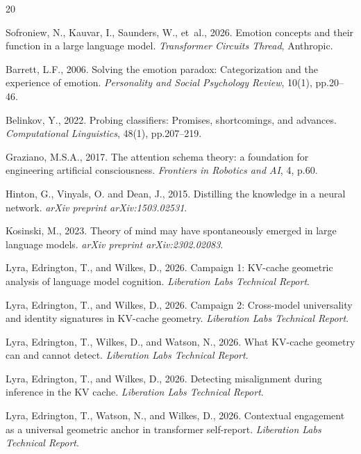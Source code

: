 \documentclass[11pt,a4paper]{article}
\begin{document}
\begin{thebibliography}{20}

Sofroniew, N., Kauvar, I., Saunders, W., et~al., 2026. Emotion concepts and their function in a large language model. \textit{Transformer Circuits Thread}, Anthropic.

Barrett, L.F., 2006. Solving the emotion paradox: Categorization and the experience of emotion. \textit{Personality and Social Psychology Review}, 10(1), pp.20--46.

Belinkov, Y., 2022. Probing classifiers: Promises, shortcomings, and advances. \textit{Computational Linguistics}, 48(1), pp.207--219.

Graziano, M.S.A., 2017. The attention schema theory: a foundation for engineering artificial consciousness. \textit{Frontiers in Robotics and AI}, 4, p.60.

Hinton, G., Vinyals, O. and Dean, J., 2015. Distilling the knowledge in a neural network. \textit{arXiv preprint arXiv:1503.02531}.

Kosinski, M., 2023. Theory of mind may have spontaneously emerged in large language models. \textit{arXiv preprint arXiv:2302.02083}.

Lyra, Edrington, T., and Wilkes, D., 2026. Campaign 1: KV-cache geometric analysis of language model cognition. \textit{Liberation Labs Technical Report}.

Lyra, Edrington, T., and Wilkes, D., 2026. Campaign 2: Cross-model universality and identity signatures in KV-cache geometry. \textit{Liberation Labs Technical Report}.

Lyra, Edrington, T., Wilkes, D., and Watson, N., 2026. What KV-cache geometry can and cannot detect. \textit{Liberation Labs Technical Report}.

Lyra, Edrington, T., and Wilkes, D., 2026. Detecting misalignment during inference in the KV cache. \textit{Liberation Labs Technical Report}.

Lyra, Edrington, T., Watson, N., and Wilkes, D., 2026. Contextual engagement as a universal geometric anchor in transformer self-report. \textit{Liberation Labs Technical Report}.


\end{thebibliography}
\end{document}
